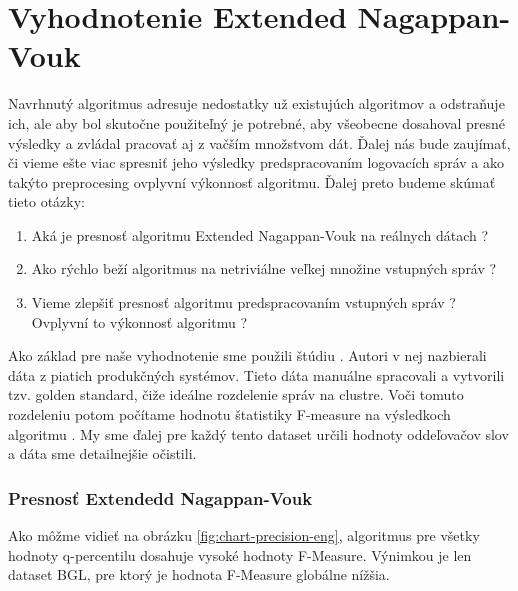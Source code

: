 \chapter{Vyhodnotenie Extended Nagappan-Vouk}
Navrhnutý algoritmus adresuje nedostatky už existujúch algoritmov a odstraňuje ich, ale aby bol skutočne použiteľný je potrebné, aby všeobecne dosahoval presné výsledky a  zvládal pracovať aj z vačším množstvom dát. Ďalej nás bude zaujímať, či vieme ešte viac spresniť jeho výsledky predspracovaním logovacích správ a ako takýto preprocesing ovplyvní výkonnosť algoritmu. Ďalej preto budeme skúmať tieto otázky:

\begin{enumerate}
  \item Aká je presnosť algoritmu Extended Nagappan-Vouk na reálnych dátach ?
  \item Ako rýchlo beží algoritmus na netriviálne veľkej množine vstupných správ ?
  \item Vieme zlepšiť presnosť algoritmu predspracovaním vstupných správ ? Ovplyvní to výkonnosť algoritmu ?
\end{enumerate}

Ako základ pre naše vyhodnotenie sme použili štúdiu \parencite{he2016}. Autori v nej nazbierali dáta z piatich produkčných systémov. Tieto dáta manuálne spracovali a vytvorili tzv. golden standard, čiže ideálne rozdelenie správ na clustre. Voči tomuto rozdeleniu potom počítame hodnotu štatistiky F-measure na výsledkoch algoritmu \parencite{goldenstandard}. My sme ďalej pre každý tento dataset určili hodnoty oddeľovačov slov a dáta sme detailnejšie očistili.

\subsection{Presnosť Extendedd Nagappan-Vouk}
Ako môžme vidieť na obrázku \ref{fig:chart-precision-eng}, algoritmus pre všetky hodnoty q-percentilu dosahuje vysoké hodnoty F-Measure. Výnimkou je len dataset BGL, pre ktorý je hodnota F-Measure globálne nížšia.

